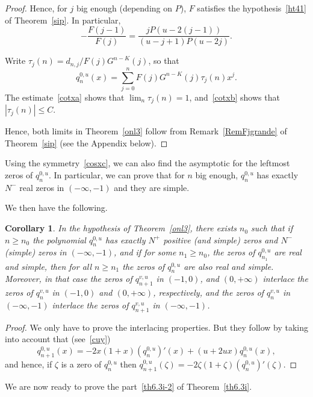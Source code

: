 \documentclass[10pt, a4paper, leqno]{amsart}
\numberwithin{equation}{section}
\theoremstyle{plain}
\newtheorem{Cor}[Theo]{Corollary}
\theoremstyle{remark}
\begin{document}
\begin{proof}
Hence, for $j$ big enough (depending on $P$), $F$ satisfies the hypothesis~\eqref{ht41} of Theorem~\ref{sip}.
In particular,
\[
  -\frac{F(j-1)}{F(j)} = \frac{jP(u-2(j-1))}{(u-j+1)P(u-2j)}.
\]

Write $\tau_j(n)=d_{n,j}/F(j)G^{n-K}(j)$, so that
\[
  q_n^{0,u}(x) = \sum_{j=0}^nF(j)G^{n-K}(j)\tau_j(n)x^j.
\]
The estimate~\eqref{cotxa} shows that $\lim_n\tau_j(n)=1$, and~\eqref{cotxb} shows that $|\tau_j(n)|\le C$.

Hence, both limits in Theorem~\ref{onl3} follow from Remark~\ref{RemFjgrande} of Theorem~\ref{sip} (see the Appendix below).
\end{proof}

Using the symmetry~\eqref{cosxc}, we can also find the asymptotic for the leftmost zeros of $q_n^{0,u}$. In particular, we can prove that for $n$ big enough, $q_n^{0,u}$ has exactly $N^-$ real zeros in $(-\infty,-1)$ and they are simple.

We then have the following.

\begin{Cor}
\label{umv}
In the hypothesis of Theorem~\ref{onl3}, there exists $n_0$ such that if $n\ge n_0$ the polynomial $q_n^{0,u}$ has exactly $N^+$ positive (and simple) zeros and $N^-$ (simple) zeros in $(-\infty,-1)$, and if for some $n_1\ge n_0$, the zeros of
$q_{n_1}^{0,u}$ are real and simple, then for all $n\ge n_1$ the zeros of $q_n^{0,u}$ are also real and simple. Moreover, in that case the zeros of $q_{n+1}^{v,u}$ in $(-1,0)$, and $(0,+\infty)$ interlace the zeros of $q_n^{v,u}$ in $(-1,0)$ and $(0,+\infty)$, respectively, and the zeros of $q_{n}^{v,u}$ in $(-\infty,-1)$ interlace the zeros of $q_{n+1}^{v,u}$ in $(-\infty,-1)$.
\end{Cor}

\begin{proof}
We only have to prove the interlacing properties. But they follow by taking into account that (see~\eqref{cuy})
\[
  q_{n+1}^{0,u}(x) = -2x(1+x)(q_n^{0,u})'(x)+(u+2ux)q_n^{0,u}(x),
\]
and hence, if $\zeta$ is a zero of $q_n^{0,u}$ then
$q_{n+1}^{0,u}(\zeta)=-2\zeta(1+\zeta)(q_n^{0,u})'(\zeta)$.
\end{proof}

We are now ready to prove the part~\eqref{th6.3i-2} of Theorem~\ref{th6.3i}.
\end{document}
